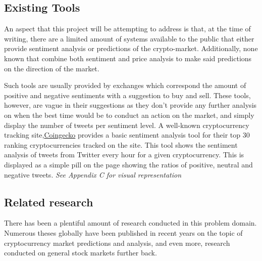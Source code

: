 \documentclass[oneside, 10pt]{article}
\begin{document}
		\subsection{Existing Tools}
		An aspect that this project will be attempting to address is that, at the time of writing, there are a limited amount of systems available to the public that either provide sentiment analysis or predictions of the crypto-market. Additionally, none known that combine both sentiment and price analysis to make said predictions on the direction of the market.
		
		Such tools are usually provided by exchanges which correspond the amount of positive and negative sentiments with a suggestion to buy and sell. These tools, however, are vague in their suggestions as they don't provide any further analysis on when the best time would be to conduct an action on the market, and simply display the number of tweets per sentiment level. A well-known cryptocurrency tracking site,\href{https://www.coingecko.com}{Coingecko} provides a basic sentiment analysis tool for their top 30 ranking cryptocurrencies tracked on the site. This tool shows the sentiment analysis of tweets from Twitter every hour for a given cryptocurrency. This is displayed as a simple pill on the page showing the ratios of positive, neutral and negative tweets. \textit{See Appendix C for visual representation}
			
		\subsection{Related research}
		
		There has been a plentiful amount of research conducted in this problem domain. Numerous theses globally have been published in recent years on the topic of cryptocurrency market predictions and analysis, and even more, research conducted on general stock markets further back. 
		
\end{document}
